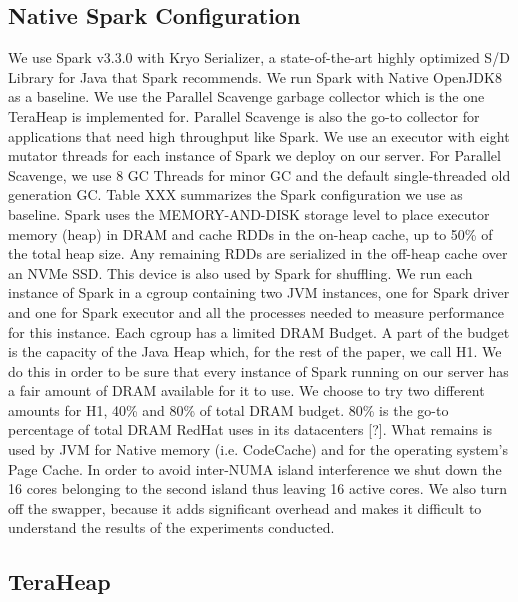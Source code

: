 \subsection{Native Spark Configuration}
We use Spark v3.3.0 with Kryo Serializer, a state-of-the-art highly
optimized S/D Library for Java that Spark recommends. We run Spark
with Native OpenJDK8 as a baseline. We use the Parallel Scavenge
garbage collector which is the one TeraHeap is implemented for.
Parallel Scavenge is also the go-to collector for applications that
need high throughput like Spark. We use an executor with eight mutator
threads for each instance of Spark we deploy on our server. For
Parallel Scavenge, we use 8 GC Threads for minor GC and the default
single-threaded old generation GC. Table XXX summarizes the Spark
configuration we use as baseline. Spark uses the MEMORY-AND-DISK
storage level to place executor memory (heap) in DRAM and cache RDDs
in the on-heap cache, up to 50\% of the total heap size. Any remaining
RDDs are serialized in the off-heap cache over an NVMe SSD. This
device is also used by Spark for shuffling. We run each instance of
Spark in a cgroup containing two JVM instances, one for Spark driver
and one for Spark executor and all the processes needed to measure
performance for this instance. Each cgroup has a limited DRAM Budget.
A part of the budget is the capacity of the Java Heap which, for the
rest of the paper, we call H1. We do this in order to be sure that
every instance of Spark running on our server has a fair amount of
DRAM available for it to use. We choose to try two different amounts
for H1, 40\% and 80\% of total DRAM budget. 80\% is the go-to
percentage of total DRAM RedHat uses in its datacenters [?]. What
remains is used by JVM for Native memory (i.e. CodeCache) and for the
operating system's Page Cache. In order to avoid inter-NUMA island
interference we shut down the 16 cores belonging to the second island
thus leaving 16 active cores. We also turn off the swapper, because it
adds significant overhead and makes it difficult to understand the
results of the experiments conducted.

\subsection{TeraHeap}
